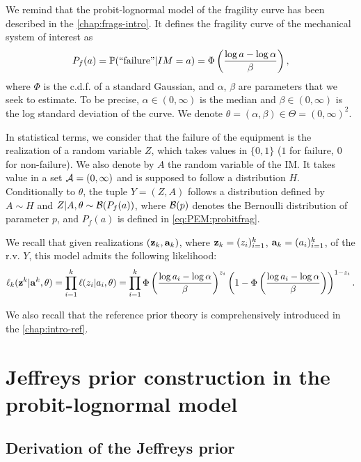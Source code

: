 We remind that the probit-lognormal model of the fragility curve has been described in the \cref{chap:frags-intro}.
It defines the fragility curve of the mechanical system of interest as 
\begin{equation}\label{eq:PEM:probitfrag}
    P_f(a)=\mathbb{P}(\text{``failure''}|IM=a) = \Phi\left(\frac{\log a-\log\alpha}{\beta}\right),
\end{equation}
where $\Phi$ is the c.d.f. of a standard Gaussian, and $\alpha$, $\beta$ are parameters that we seek to estimate. To be precise, $\alpha\in(0,\infty)$ is the median and $\beta\in(0,\infty)$ is the log standard deviation of the curve. We denote $\theta=(\alpha,\beta)\in\Theta=(0,\infty)^2$.

In statistical terms, we consider that the failure of the equipment is the realization of a random variable $Z$, which takes values in $\{0,1\}$ ($1$ for failure, $0$ for non-failure). We also denote by $A$ the random variable of the IM. It takes value in a set $\mathcal{A}=(0,\infty)$ and is supposed to follow a distribution $H$. Conditionally to $\theta$, the tuple $Y=(Z,A)$ follows a distribution defined by $A\sim H$ and $Z|A,\theta\sim\mathcal{B}(P_f(a))$, where $\mathcal{B}(p)$ denotes the Bernoulli distribution of parameter $p$, and $P_f(a)$ is defined in \cref{eq:PEM:probitfrag}.

We recall that given realizations $(\mathbf{z}_k,\mathbf{a}_k)$, where $\mathbf{z}_k=(z_i)_{i=1}^k$, $\mathbf{a}_k=(a_i)_{i=1}^k$, of the r.v. $Y$, this model admits the following likelihood:
\begin{equation}
    \ell_k(\mathbf{z}^k|\mathbf{a}^k,\theta) = \prod_{i=1}^k\ell(z_i|a_i,\theta) = \prod_{i=1}^k\Phi\left(\frac{\log a_i-\log\alpha}{\beta}\right)^{z_i}\left(1-\Phi\left(\frac{\log a_i-\log\alpha}{\beta}\right)\right)^{1-z_i}.
\end{equation}




We also recall that the reference prior theory is comprehensively introduced in the \cref{chap:intro-ref}. 





\section{Jeffreys prior construction in the probit-lognormal model}


    \subsection{Derivation of the Jeffreys prior}


